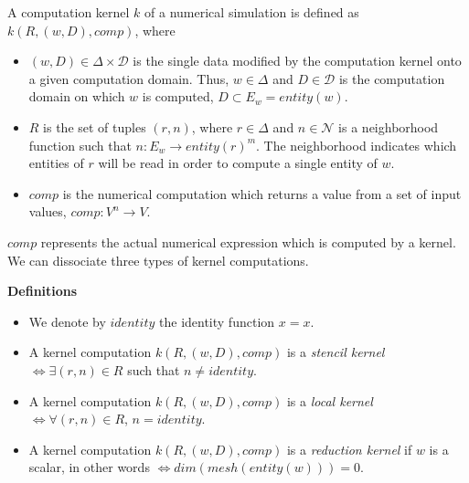 \begin{mydef}
A computation kernel $k$ of a numerical simulation is defined as $k(R,(w,D),comp)$, where 
\begin{itemize}
\item $(w,D) \in \Delta \times \mathcal{D}$ is the single data modified by the computation kernel onto a given computation domain. Thus, $w \in \Delta$ and $D \in \mathcal{D}$ is the computation domain on which $w$ is computed, $D \subset E_w=entity(w)$.
\item $R$ is the set of tuples $(r,n)$, where $r \in \Delta$ and $n \in \mathcal{N}$ is a neighborhood function such that $n : E_w \rightarrow entity(r)^m$. The neighborhood indicates which entities of $r$ will be read in order to compute a single entity of $w$. 
\item $comp$ is the numerical computation which returns a value from a set of input values, $comp: V^n \rightarrow V$.
\end{itemize}
\end{mydef}

$comp$ represents the actual numerical expression which is computed by a kernel. We can dissociate three types of kernel computations.

\noindent \textbf{Definitions}
\begin{itemize}
\item We denote by $identity$ the identity function $x=x$.
\item A kernel computation $k(R,(w,D),comp)$ is a \emph{stencil kernel} $\iff \exists (r,n) \in R$ such that $n \neq identity$.
\item A kernel computation $k(R,(w,D),comp)$ is a \emph{local kernel} $\iff \forall (r,n) \in R$, $n = identity$.
\item A kernel computation $k(R,(w,D),comp)$ is a \emph{reduction kernel} if $w$ is a scalar, in other words $\iff dim(mesh(entity(w)))=0$.
\end{itemize}

